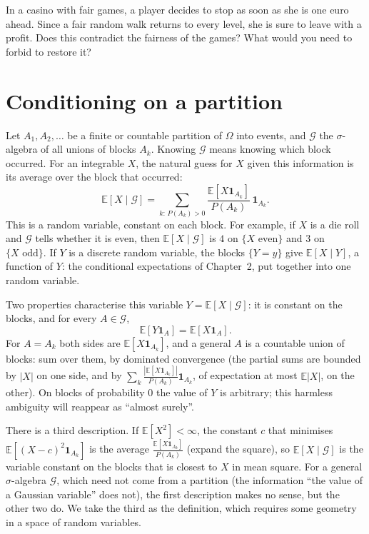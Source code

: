 \begin{think}
In a casino with fair games, a player decides to stop as soon as she is one euro ahead. Since a fair random walk
returns to every level, she is sure to leave with a profit. Does this contradict the fairness of the games? What
would you need to forbid to restore it?
\end{think}

\section{Conditioning on a partition}

Let $A_1,A_2,\ldots$ be a finite or countable partition of $\Omega$ into events, and $\mathcal G$ the $\sigma$-algebra of all unions of blocks $A_k$. Knowing
$\mathcal G$ means knowing which block occurred. For an integrable $X$, the natural guess for $X$ given this information is its
average over the block that occurred:
\[
\mathbb E[X\mid\mathcal G]=\sum_{k:\,P(A_k)>0}\frac{\mathbb E[X\mathbf 1_{A_k}]}{P(A_k)}\,\mathbf 1_{A_k}.
\]
This is a random variable, constant on each block. For example, if $X$ is a die roll and $\mathcal G$ tells whether it is even, then
$\mathbb E[X\mid\mathcal G]$ is $4$ on $\{X\text{ even}\}$ and $3$ on $\{X\text{ odd}\}$. If $Y$ is a discrete random variable, the blocks $\{Y=y\}$ give $\mathbb E[X\mid Y]$, a
function of $Y$: the conditional expectations of Chapter~2, put together into one random variable.

Two properties characterise this variable $Y=\mathbb E[X\mid\mathcal G]$: it is constant on the blocks, and for every $A\in\mathcal G$,
\[
\mathbb E[Y\mathbf 1_A]=\mathbb E[X\mathbf 1_A].
\]
For $A=A_k$ both sides are $\mathbb E[X\mathbf 1_{A_k}]$, and a general $A$ is a countable union of blocks: sum over them, by dominated convergence
(the partial sums are bounded by $|X|$ on one side, and by $\sum_k\frac{|\mathbb E[X\mathbf 1_{A_k}]|}{P(A_k)}\mathbf 1_{A_k}$, of expectation at most $\mathbb E|X|$, on the other). On blocks
of probability $0$ the value of $Y$ is arbitrary; this harmless ambiguity will reappear as ``almost surely''.

There is a third description. If $\mathbb E[X^2]<\infty$, the constant $c$ that minimises $\mathbb E[(X-c)^2\mathbf 1_{A_k}]$ is the average $\frac{\mathbb E[X\mathbf 1_{A_k}]}{P(A_k)}$ (expand the square),
so $\mathbb E[X\mid\mathcal G]$ is the variable constant on the blocks that is closest to $X$ in mean square. For a general $\sigma$-algebra
$\mathcal G$, which need not come from a partition (the information ``the value of a Gaussian variable'' does not), the
first description makes no sense, but the other two do. We take the third as the definition, which requires some
geometry in a space of random variables.

